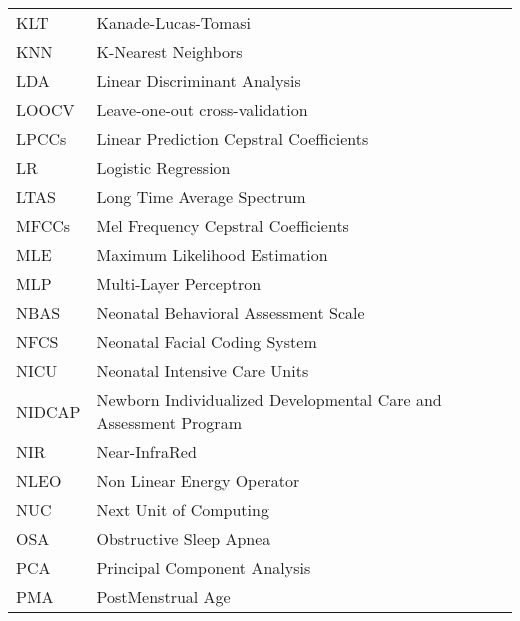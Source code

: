 \begin{tabular}{ll}
KLT & Kanade-Lucas-Tomasi \\
KNN & K-Nearest Neighbors \\
LDA & Linear Discriminant Analysis \\
LOOCV & Leave-one-out cross-validation \\
LPCCs & Linear Prediction Cepstral Coefficients \\
LR & Logistic Regression \\
LTAS & Long Time Average Spectrum \\
MFCCs & Mel Frequency Cepstral Coefficients \\
MLE & Maximum Likelihood Estimation \\
MLP & Multi-Layer Perceptron \\
NBAS & Neonatal Behavioral Assessment Scale \\
NFCS & Neonatal Facial Coding System \\
NICU & Neonatal Intensive Care Units\\
NIDCAP & Newborn Individualized Developmental Care and Assessment Program  \\
NIR & Near-InfraRed \\
NLEO & Non Linear Energy Operator \\
NUC & Next Unit of Computing \\
OSA & Obstructive Sleep Apnea \\
PCA & Principal Component Analysis \\
PMA & PostMenstrual Age \\


\end{tabular}


